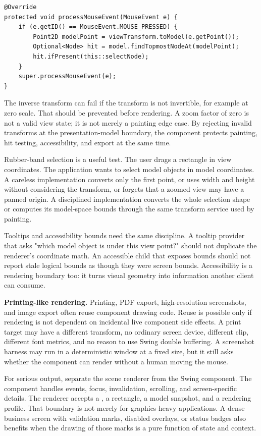 \begin{lstlisting}[caption={Hit testing a model shape from a mouse event.}]
@Override
protected void processMouseEvent(MouseEvent e) {
    if (e.getID() == MouseEvent.MOUSE_PRESSED) {
        Point2D modelPoint = viewTransform.toModel(e.getPoint());
        Optional<Node> hit = model.findTopmostNodeAt(modelPoint);
        hit.ifPresent(this::selectNode);
    }
    super.processMouseEvent(e);
}
\end{lstlisting}

The inverse transform can fail if the transform is not invertible, for example at zero scale. That should be prevented before rendering. A zoom factor of zero is not a valid view state; it is not merely a painting edge case. By rejecting invalid transforms at the presentation-model boundary, the component protects painting, hit testing, accessibility, and export at the same time.

Rubber-band selection is a useful test. The user drags a rectangle in view coordinates. The application wants to select model objects in model coordinates. A careless implementation converts only the first point, or uses width and height without considering the transform, or forgets that a zoomed view may have a panned origin. A disciplined implementation converts the whole selection shape or computes its model-space bounds through the same transform service used by painting.

Tooltips and accessibility bounds need the same discipline. A tooltip provider that asks "which model object is under this view point?" should not duplicate the renderer's coordinate math. An accessible child that exposes bounds should not report stale logical bounds as though they were screen bounds. Accessibility is a rendering boundary too: it turns visual geometry into information another client can consume.

\textbf{Printing-like rendering.} Printing, PDF export, high-resolution screenshots, and image export often reuse component drawing code. Reuse is possible only if rendering is not dependent on incidental live component side effects. A print target may have a different transform, no ordinary screen device, different clip, different font metrics, and no reason to use Swing double buffering. A screenshot harness may run in a deterministic window at a fixed size, but it still asks whether the component can render without a human moving the mouse.

For serious output, separate the scene renderer from the Swing component. The component handles events, focus, invalidation, scrolling, and screen-specific details. The renderer accepts a , a rectangle, a model snapshot, and a rendering profile. That boundary is not merely for graphics-heavy applications. A dense business screen with validation marks, disabled overlays, or status badges also benefits when the drawing of those marks is a pure function of state and context.

